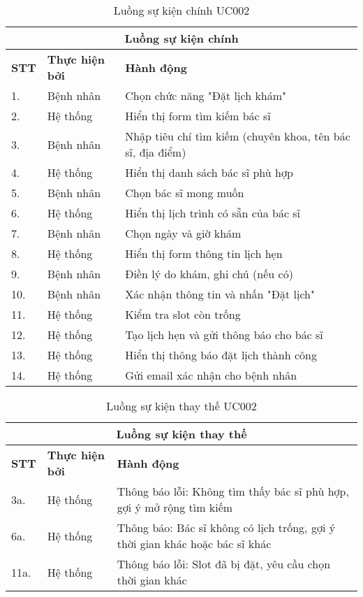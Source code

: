 \documentclass[../DoAn.tex]{subfiles}
\begin{document}
\begin{table}[H]
\centering
\begin{tabular}{|p{1cm}|p{3cm}|p{9cm}|}
\hline
\multicolumn{3}{|c|}{\textbf{Luồng sự kiện chính}} \\
\hline
\textbf{STT} & \textbf{Thực hiện bởi} & \textbf{Hành động} \\
\hline
1. & Bệnh nhân & Chọn chức năng "Đặt lịch khám" \\
\hline
2. & Hệ thống & Hiển thị form tìm kiếm bác sĩ \\
\hline
3. & Bệnh nhân & Nhập tiêu chí tìm kiếm (chuyên khoa, tên bác sĩ, địa điểm) \\
\hline
4. & Hệ thống & Hiển thị danh sách bác sĩ phù hợp \\
\hline
5. & Bệnh nhân & Chọn bác sĩ mong muốn \\
\hline
6. & Hệ thống & Hiển thị lịch trình có sẵn của bác sĩ \\
\hline
7. & Bệnh nhân & Chọn ngày và giờ khám \\
\hline
8. & Hệ thống & Hiển thị form thông tin lịch hẹn \\
\hline
9. & Bệnh nhân & Điền lý do khám, ghi chú (nếu có) \\
\hline
10. & Bệnh nhân & Xác nhận thông tin và nhấn "Đặt lịch" \\
\hline
11. & Hệ thống & Kiểm tra slot còn trống \\
\hline
12. & Hệ thống & Tạo lịch hẹn và gửi thông báo cho bác sĩ \\
\hline
13. & Hệ thống & Hiển thị thông báo đặt lịch thành công \\
\hline
14. & Hệ thống & Gửi email xác nhận cho bệnh nhân \\
\hline
\end{tabular}
\caption{Luồng sự kiện chính UC002}
\end{table}

\begin{table}[H]
\centering
\begin{tabular}{|p{1cm}|p{3cm}|p{9cm}|}
\hline
\multicolumn{3}{|c|}{\textbf{Luồng sự kiện thay thế}} \\
\hline
\textbf{STT} & \textbf{Thực hiện bởi} & \textbf{Hành động} \\
\hline
3a. & Hệ thống & Thông báo lỗi: Không tìm thấy bác sĩ phù hợp, gợi ý mở rộng tìm kiếm \\
\hline
6a. & Hệ thống & Thông báo: Bác sĩ không có lịch trống, gợi ý thời gian khác hoặc bác sĩ khác \\
\hline
11a. & Hệ thống & Thông báo lỗi: Slot đã bị đặt, yêu cầu chọn thời gian khác \\
\hline
\end{tabular}
\caption{Luồng sự kiện thay thế UC002}
\end{table}
\end{document}
